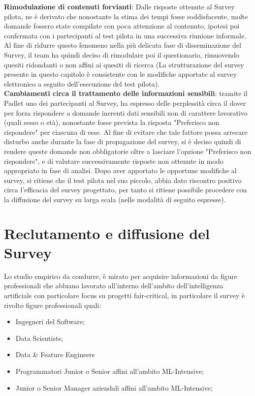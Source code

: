    \textbf{Rimodulazione di contenuti forvianti}:
   Dalle risposte ottenute al Survey pilota, ne è derivato che nonostante la stima dei tempi fosse soddisfacente, molte domande fossero state compilate con poca attenzione al contenuto, ipotesi poi confermata con i partecipanti al test pilota in una successiva riunione informale. Al fine di ridurre questo fenomeno nella più delicata fase di disseminazione del Survey, il team ha quindi deciso di rimodulare poi il questionario, rimuovendo quesiti ridondanti o non affini ai quesiti di ricerca (La strutturazione del survey presente in questo capitolo è consistente con le modifiche apportate al survey elettronico a seguito dell'esecuzione del test pilota). \\
   
   \textbf{Cambiamenti circa il trattamento delle informazioni sensibili}: 
   tramite il Padlet uno dei partecipanti al Survey, ha espresso delle perplessità circa il dover per forza rispondere a domande inerenti dati sensibili non di carattere lavorativo (quali sesso o età), nonostante fosse prevista la risposta "Preferisco non rispondere" per ciascuna di esse.  Al fine di evitare che tale fattore possa arrecare disturbo anche durante la fase di propagazione del survey, si è deciso quindi di rendere queste domande non obbligatorie oltre a lasciare l'opzione "Preferisco non rispondere", e di valutare successivamente risposte non ottenute in modo appropriato in fase di analisi. Dopo aver apportato le opportune modifiche al survey, si ritiene che il test pilota nel suo piccolo, abbia dato riscontro positivo circa l'efficacia del survey progettato, per tanto si ritiene possibile procedere con la diffusione del survey su larga scala (nelle modalità di seguito espresse).
    
    
    
    \section{Reclutamento e diffusione del Survey}
    
    Lo studio empirico da condurre, è mirato per acquisire informazioni da figure professionali che abbiano lavorato all'interno dell'ambito dell'intelligenza artificiale con particolare focus su progetti fair-critical, in particolare il survey è rivolto figure professionali quali:
    
        \begin{itemize}
            \item Ingegneri del Software;
            \item Data Scientists;
            \item Data \& Feature Engineers
            \item Programmatori Junior o Senior affini all'ambito ML-Intensive;
            \item Junior o Senior Manager aziendali affini all'ambito ML-Intensive;
        \end{itemize}
        
